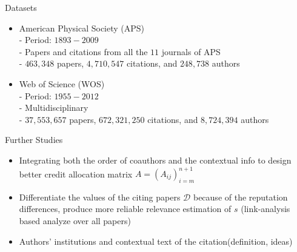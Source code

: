 \documentclass{beamer}
\begin{document}
\begin{frame}{Datasets}
\begin{itemize}
\item
American Physical Society (APS)\\
\small{
- Period: $1893 - 2009$\\
- Papers and citations from all the $11$ journals of APS\\
- $463,348$ papers, $4,710,547$ citations, and $248,738$ authors
}
\item
Web of Science (WOS)\\
\small{
- Period: $1955-2012$\\
- Multidisciplinary\\
- $37,553,657$ papers, $672,321,250$ citations, and $8,724,394$ authors
}
\end{itemize}
\end{frame}


\begin{frame}{Further Studies}
\begin{itemize}
\item Integrating both the order of coauthors and the contextual info to design better credit allocation matrix $A=(A_{ij})_{i=m}^{n+1}$
\item Differentiate the values of the citing papers $\mathcal D$ because of the reputation differences, produce more reliable relevance estimation of $s$ (link-analysis based analyze over all papers) 
\item Authors' institutions and contextual text of the citation(definition, ideas)
\end{itemize}
\end{frame}

\begin{frame}[allowframebreaks]
\tiny

\end{frame}
\end{document}
